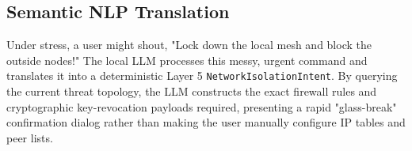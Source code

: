 \subsection{Semantic NLP Translation}
Under stress, a user might shout, "Lock down the local mesh and block the outside nodes!" The local LLM processes this messy, urgent command and translates it into a deterministic Layer 5 \texttt{NetworkIsolationIntent}. By querying the current threat topology, the LLM constructs the exact firewall rules and cryptographic key-revocation payloads required, presenting a rapid "glass-break" confirmation dialog rather than making the user manually configure IP tables and peer lists.
